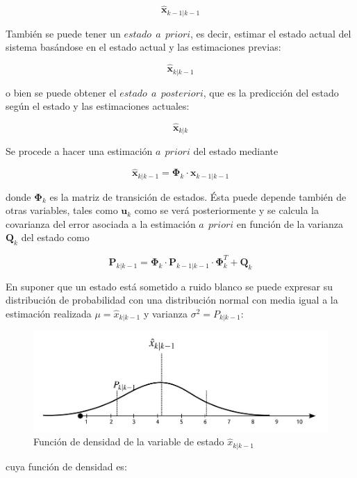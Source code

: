 \documentclass[twoside,11pt]{report}
\begin{document}
\begin{equation}
\hat{\mathbf{x}}_{k-1|k-1}
\end{equation}

También se puede tener un $estado \>\> a \>\> priori$, es decir, estimar el estado actual del sistema basándose en el estado actual y las estimaciones previas:

\begin{equation}
\hat{\mathbf{x}}_{k|k-1}
\end{equation}

o bien se puede obtener el $estado \>\> a \>\> posteriori$, que es la predicción del estado según el estado y las estimaciones actuales:

\begin{equation}
\hat{\mathbf{x}}_{k|k}
\end{equation}

Se procede a hacer una estimación $a \>\> priori$ del estado mediante

\begin{equation}
\hat{\mathbf{x}}_{k|k-1} =\mathbf{\Phi}_{k} \cdot \mathbf{x}_{k-1|k-1}
\end{equation}

donde $\mathbf{\Phi}_{k}$ es la matriz de transición de estados. Ésta puede depende también de otras variables, tales como $\mathbf{u}_{k}$ como se verá posteriormente y se calcula la covarianza del error asociada a la estimación $a \>\> priori$ en función de la varianza $\mathbf{Q}_{k}$ del estado como

\begin{equation}
\mathbf{P}_{k|k-1}=\mathbf{\Phi}_{k} \cdot \mathbf{P}_{k-1|k-1} \cdot \mathbf{\Phi}_{k}^{T} + \mathbf{Q}_{k}
\end{equation}

En suponer que un estado está sometido a ruido blanco se puede expresar su distribución de probabilidad con una distribución normal con media igual a la estimación realizada $\mu=\hat{x}_{k|k-1}$ y varianza $\sigma^{2}=P_{k|k-1}$:

\begin{figure}[h!]
\begin{center}
\includegraphics[scale=0.35]{images/fun_dens_x.jpeg}
\caption{Función de densidad de la variable de estado $\hat{x}_{k|k-1}$}
\end{center}
\end{figure}
\newpage
cuya función de densidad es:
\end{document}
